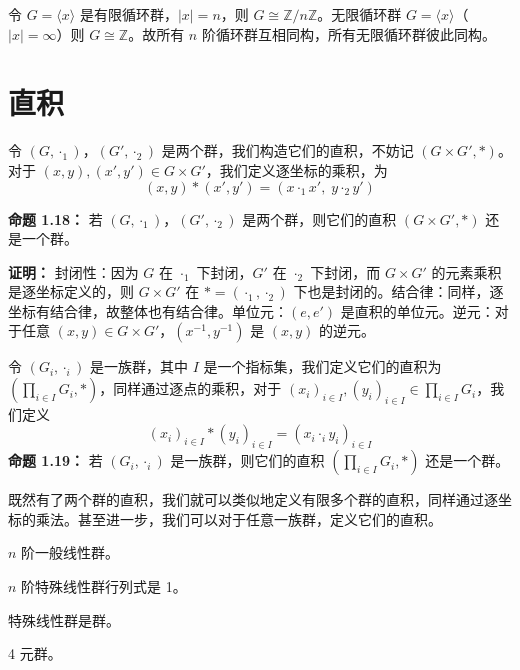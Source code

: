 \begin{proposition}
令 $G=\langle x\rangle$ 是有限循环群，$|x|=n$，则 $G\cong\mathbb{Z}/n\mathbb{Z}$。无限循环群 $G=\langle x\rangle$（$|x|=\infty$）则 $G\cong\mathbb{Z}$。故所有 $n$ 阶循环群互相同构，所有无限循环群彼此同构。
\end{proposition}

\section{直积}

\begin{definition}[两个群直积（定义 1.18）]
令 $(G,\cdot_1)$，$(G',\cdot_2)$ 是两个群，我们构造它们的直积，不妨记 $(G\times G',*)$。对于 $(x,y),(x',y')\in G\times G'$，我们定义逐坐标的乘积，为
\[
(x,y)*(x',y')=(x\cdot_1 x',\;y\cdot_2 y')
\]

\textbf{命题 1.18：} 若 $(G,\cdot_1)$，$(G',\cdot_2)$ 是两个群，则它们的直积 $(G\times G',*)$ 还是一个群。

\textbf{证明：} 封闭性：因为 $G$ 在 $\cdot_1$ 下封闭，$G'$ 在 $\cdot_2$ 下封闭，而 $G\times G'$ 的元素乘积是逐坐标定义的，则 $G\times G'$ 在 $*=(\cdot_1,\cdot_2)$ 下也是封闭的。结合律：同样，逐坐标有结合律，故整体也有结合律。单位元：$(e,e')$ 是直积的单位元。逆元：对于任意 $(x,y)\in G\times G'$，$(x^{-1},y^{-1})$ 是 $(x,y)$ 的逆元。
\end{definition}

\begin{definition}[一族群的直积（定义 1.19）]
令 $(G_i,\cdot_i)$ 是一族群，其中 $I$ 是一个指标集，我们定义它们的直积为 $(\prod_{i\in I}G_i,*)$，同样通过逐点的乘积，对于 $(x_i)_{i\in I},(y_i)_{i\in I}\in\prod_{i\in I}G_i$，我们定义
\[
(x_i)_{i\in I}*(y_i)_{i\in I}=(x_i\cdot_i y_i)_{i\in I}
\]
\textbf{命题 1.19：} 若 $(G_i,\cdot_i)$ 是一族群，则它们的直积 $(\prod_{i\in I}G_i,*)$ 还是一个群。

既然有了两个群的直积，我们就可以类似地定义有限多个群的直积，同样通过逐坐标的乘法。甚至进一步，我们可以对于任意一族群，定义它们的直积。
\end{definition}

\begin{definition}[$n$ 阶一般线性群（定义 1.11）]
$n$ 阶一般线性群。
\end{definition}

\begin{definition}[$n$ 阶特殊线性群行列式是 1（定义 1.12）]
$n$ 阶特殊线性群行列式是 1。
\end{definition}

\begin{proposition}[命题 1.12：特殊线性群是群]
特殊线性群是群。
\end{proposition}

\begin{example}[4 元群]
4 元群。
\end{example}
